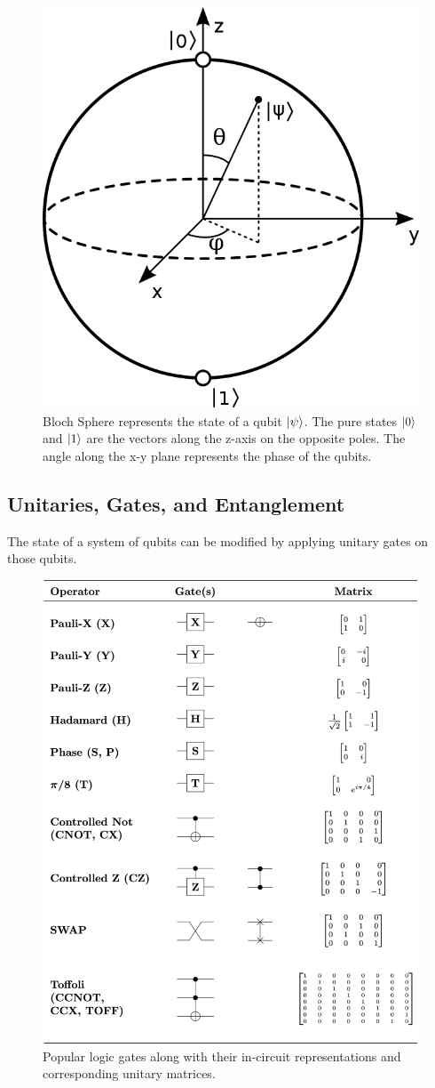 \begin{figure}[ht]
    \centering
    \includegraphics[width=0.5\linewidth]{figures/quantum/bloch_sphere.png}
    \caption[Block Sphere representation of Quantum States]{Bloch Sphere represents the state of a qubit $\ket{\psi}$. The pure states $\ket{0}$ and $\ket{1}$ are the vectors along the z-axis on the opposite poles. The angle along the x-y plane represents the phase of the qubits.}
    \label{fig:bloch-sphere}
\end{figure}


\subsection{Unitaries, Gates, and Entanglement}
\label{sec:background-unitary-gate-entanglement}

The state of a system of qubits can be modified by applying unitary gates on those qubits.

\begin{figure}[ht]
    \centering
    \includegraphics[width=0.7\linewidth]{figures/quantum/quantum_logic_gates.png}
    \caption[List of Logic Gates]{Popular logic gates along with their in-circuit representations and corresponding unitary matrices.}
    \label{fig:quantum-unitary-gates}
\end{figure}

